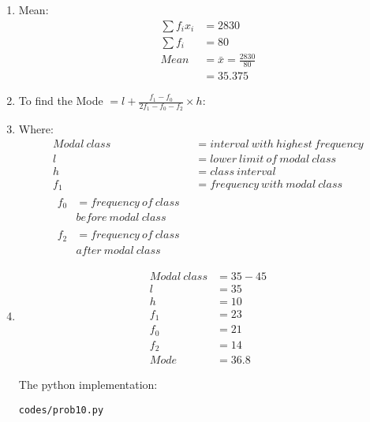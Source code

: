 \begin{enumerate}
\item Mean:
\begin{align*}
\sum f_i x_i &= 2830\\
\sum f_i &= 80\\
Mean &= \bar{x} = \frac{2830}{80}\\
&= 35.375
\end{align*}

\item To find the Mode $= l + \frac{f_1 - f_0}{2f_1 - f_0 - f_2} \times h$: 

\item Where:
\begin{align*}
Modal\ class &= interval\ with\ highest\ frequency\\
l &= lower\ limit\ of\ modal\ class\\
h &= class\ interval\\
f_1 &= frequency\ with\ modal\ class\\
\begin{split}
f_0 &= frequency\ of\ class\ \\ &before\ modal\ class
\end{split}\\
\begin{split}
f_2 &= frequency\ of\ class\ \\ &after\ modal\ class
\end{split}
\end{align*}

\item 
\begin{align}
Modal\ class &= 35 - 45\\ 
l &=  35\\
h &= 10\\
f_1 &= 23\\
f_0 &= 21\\
f_2 &= 14\\
Mode &= 36.8
\end{align}

The python implementation:
\begin{lstlisting}
codes/prob10.py
\end{lstlisting}

\end{enumerate}